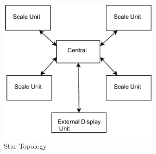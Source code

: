 \begin{figure}
\begin{center}
\includegraphics[width=8cm]{design/figures/star_topology}
\end{center}
\caption{Star Topology}
\label{fig:star}
\end{figure}
